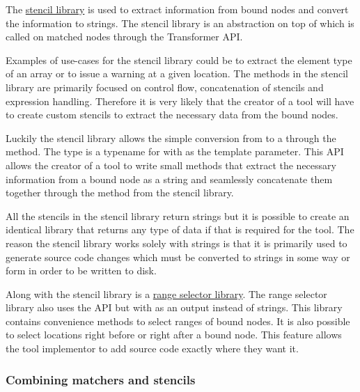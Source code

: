 The \href{https://github.com/llvm/llvm-project/blob/main/clang/include/clang/Tooling/Transformer/Stencil.h}{stencil library} is used to extract information from bound nodes and convert the information to strings.  The stencil library is an abstraction on top of  which is called on matched nodes through the Transformer API. 

Examples of use-cases for the stencil library could be to extract the element type of an array or to issue a warning at a given location. The methods in the stencil library are primarily focused on control flow, concatenation of stencils and expression handling. Therefore it is very likely that the creator of a tool will have to create custom stencils to extract the necessary data from the bound nodes.

Luckily the stencil library allows the simple conversion from  to a  through the  method. The  type is a typename for  with  as the template parameter. This API allows the creator of a tool to write small methods that extract the necessary information from a bound node as a string and seamlessly concatenate them together through the  method from the stencil library.

All the stencils in the stencil library return strings but it is possible to create an identical library that returns any type of data if that is required for the tool. The reason the stencil library works solely with strings is that it is primarily used to generate source code changes which must be converted to strings in some way or form in order to be written to disk. 

Along with the stencil library is a \href{https://github.com/llvm/llvm-project/blob/main/clang/include/clang/Tooling/Transformer/RangeSelector.h}{range selector library}. The range selector library also uses the  API but with  as an output instead of strings. This library contains convenience methods to select ranges of bound nodes. It is also possible to select locations right before or right after a bound node. This feature allows the tool implementor to add source code exactly where they want it.

\subsubsection*{Combining matchers and stencils}


